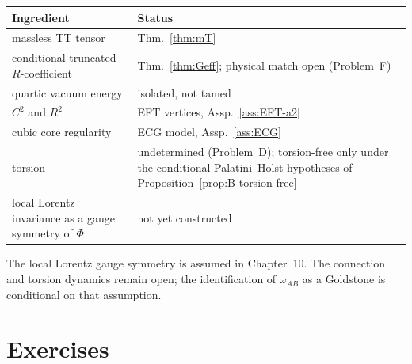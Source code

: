 \begin{center}
\begin{tabular}{@{}p{}p{}@{}}
\toprule
Ingredient & Status \\
\midrule
massless TT tensor & Thm.~\ref{thm:mT} \\
conditional truncated \(R\)-coefficient & Thm.~\ref{thm:Geff}; physical match open (Problem~F) \\
quartic vacuum energy & isolated, not tamed \\
\(C^2\) and \(R^2\) & EFT vertices, Assp.~\ref{ass:EFT-a2} \\
cubic core regularity & ECG model, Assp.~\ref{ass:ECG} \\
torsion & undetermined (Problem~D); torsion-free only under the
conditional Palatini--Holst hypotheses of
Proposition~\ref{prop:B-torsion-free} \\
local Lorentz invariance as a gauge symmetry
  of \(\Phi\) & not yet constructed \\
\bottomrule
\end{tabular}
\end{center}

The local Lorentz gauge symmetry is assumed in Chapter~10. The
connection and torsion dynamics remain open; the identification of
\(\omega_{AB}\) as a Goldstone is conditional on that assumption.

\section{Exercises}
\label{sec:ch9-exercises}

